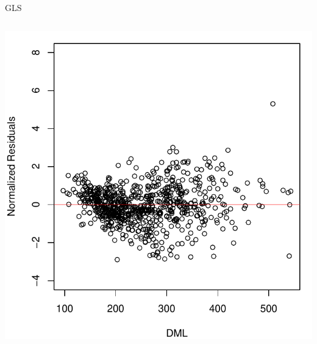 \documentclass{beamer}\usepackage[]{graphicx}\usepackage[]{color}
\newenvironment{knitrout}{}{} %
\renewenvironment{knitrout}{\setlength{\topsep}{0mm}}{}
\begin{document}
\begin{frame}[fragile]{GLS}
\begin{columns}[c]
\begin{knitrout}
\includegraphics[width=0.7\linewidth]{figure/glsp2-2} 

\end{knitrout}

\end{columns}

\end{frame}
\end{document}
